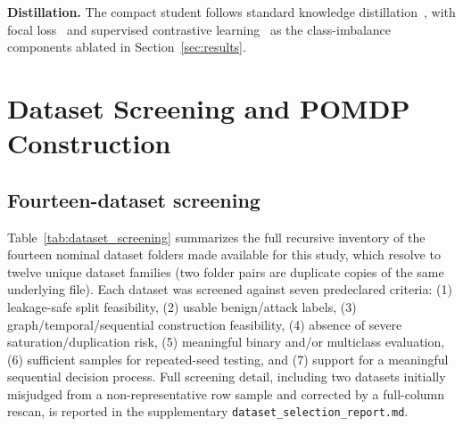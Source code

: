 \documentclass[journal]{IEEEtran}
\begin{document}
\textbf{Distillation.} The compact student follows standard knowledge
distillation~\cite{hinton2015distilling}, with focal loss~\cite{lin2017focal}
and supervised contrastive learning~\cite{khosla2020supcon} as the
class-imbalance components ablated in Section~\ref{sec:results}.

\section{Dataset Screening and POMDP Construction}
\label{sec:datasets}

\subsection{Fourteen-dataset screening}
Table~\ref{tab:dataset_screening} summarizes the full recursive inventory of
the fourteen nominal dataset folders made available for this study, which
resolve to twelve unique dataset families (two folder pairs are duplicate
copies of the same underlying file). Each dataset was screened against seven
predeclared criteria: (1) leakage-safe split feasibility, (2) usable
benign/attack labels, (3) graph/temporal/sequential construction feasibility,
(4) absence of severe saturation/duplication risk, (5) meaningful binary
and/or multiclass evaluation, (6) sufficient samples for repeated-seed
testing, and (7) support for a meaningful sequential decision process. Full
screening detail, including two datasets initially misjudged from a
non-representative row sample and corrected by a full-column rescan, is
reported in the supplementary \texttt{dataset\_selection\_report.md}.


\end{document}
